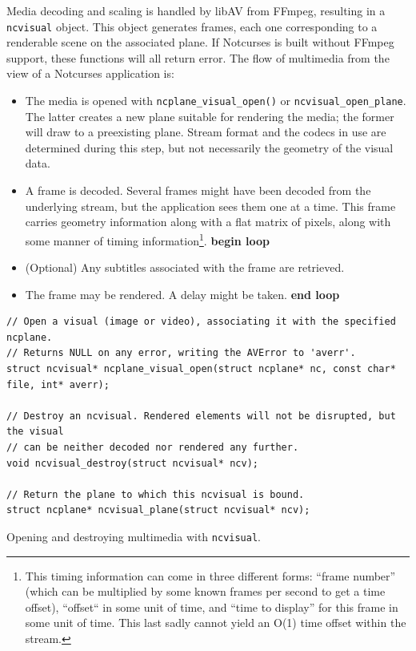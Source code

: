 \documentclass[letterpaper,10pt]{article}
\newenvironment{denseitemize}{
  \begin{itemize}
      \setlength{\itemsep}{0pt}
}{
  \end{itemize}
}
\begin{document}
Media decoding and scaling is handled by libAV from FFmpeg, resulting in a
\texttt{ncvisual} object. This object generates frames, each one
corresponding to a renderable scene on the associated plane. If Notcurses
is built without FFmpeg support, these functions will all return error.
The flow of multimedia from the view of a Notcurses application is:
\begin{denseitemize}
\item{The media is opened with \texttt{ncplane\_visual\_open()} or
    \texttt{ncvisual\_open\_plane}. The latter creates a new plane suitable
    for rendering the media; the former will draw to a preexisting plane.
    Stream format and the codecs in use are determined during this step, but
    not necessarily the geometry of the visual data.}
\item{A frame is decoded. Several frames might have been decoded from the
    underlying stream, but the application sees them one at a time. This frame
    carries geometry information along with a flat matrix of pixels, along with
    some manner of timing information\footnote{This timing information can come
    in three different forms: ``frame number'' (which can be multiplied by
    some known frames per second to get a time offset), ``offset`` in some
    unit of time, and ``time to display'' for this frame in some unit of
    time. This last sadly cannot yield an O(1) time offset within the
    stream.}. \textbf{begin loop}}
\item{(Optional) Any subtitles associated with the frame are retrieved.}
\item{The frame may be rendered. A delay might be taken. \textbf{end loop}}
\end{denseitemize}

\begin{listing}[!htb]
\begin{verbatim}
// Open a visual (image or video), associating it with the specified ncplane.
// Returns NULL on any error, writing the AVError to 'averr'.
struct ncvisual* ncplane_visual_open(struct ncplane* nc, const char* file, int* averr);

// Destroy an ncvisual. Rendered elements will not be disrupted, but the visual
// can be neither decoded nor rendered any further.
void ncvisual_destroy(struct ncvisual* ncv);

// Return the plane to which this ncvisual is bound.
struct ncplane* ncvisual_plane(struct ncvisual* ncv);
\end{verbatim}
\caption{Opening and destroying multimedia with \texttt{ncvisual}.}
\label{list:ncvisual}
\end{listing}
\end{document}
